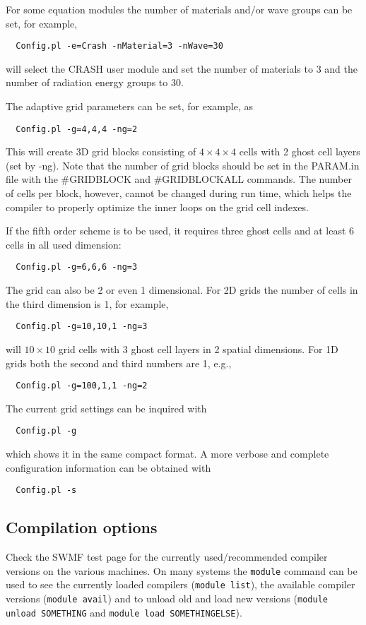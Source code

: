For some equation modules the number of materials and/or wave groups can be set, 
for example, 
\begin{verbatim}
  Config.pl -e=Crash -nMaterial=3 -nWave=30
\end{verbatim}
will select the CRASH user module and set the number of materials to 3 and the 
number of radiation energy groups to 30.

The adaptive grid parameters can be set, for example, as
\begin{verbatim}
  Config.pl -g=4,4,4 -ng=2
\end{verbatim}
This will create 3D grid blocks consisting of $4\times 4\times 4$ cells
with 2 ghost cell layers (set by -ng).
Note that the number of grid blocks should
be set in the PARAM.in file with the \#GRIDBLOCK and \#GRIDBLOCKALL commands.
The number of cells per
block, however, cannot be changed during run time, which helps the compiler
to properly optimize the inner loops on the grid cell indexes.

If the fifth order scheme is to be used, it requires three ghost cells
and at least 6 cells in all used dimension:
\begin{verbatim}
  Config.pl -g=6,6,6 -ng=3
\end{verbatim}
The grid can also be 2 or even 1 dimensional. For 2D grids the number
of cells in the third dimension is 1, for example,
\begin{verbatim}
  Config.pl -g=10,10,1 -ng=3
\end{verbatim}
will $10\times 10$ grid cells with 3 ghost cell layers in 2 spatial dimensions.
For 1D grids both the second and third numbers are 1, e.g., 
\begin{verbatim}
  Config.pl -g=100,1,1 -ng=2
\end{verbatim}
The current grid settings can be inquired with
\begin{verbatim}
  Config.pl -g
\end{verbatim}
which shows it in the same compact format. A more verbose and complete
configuration information can be obtained with
\begin{verbatim}
  Config.pl -s
\end{verbatim}

\subsection{Compilation options}

Check the SWMF test page for the currently used/recommended 
compiler versions on the various machines. On many systems the
{\tt module} command can be used to see the currently loaded
compilers ({\tt module list}), the available compiler versions
({\tt module avail}) and to unload old and load new versions
({\tt module unload SOMETHING} and {\tt module load SOMETHINGELSE}).

